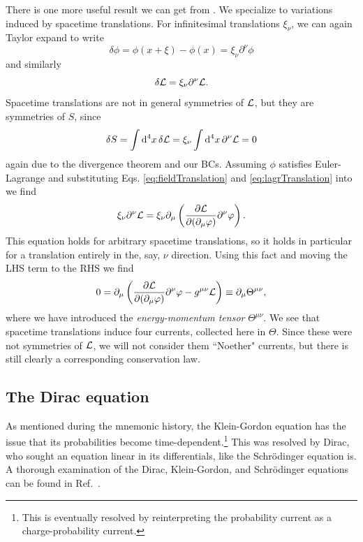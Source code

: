 There is one more useful result we can get from .
We specialize to variations induced by spacetime translations. For infinitesimal
translations $\xi_\nu$, we can again Taylor expand to write
\begin{equation}\label{eq:fieldTranslation}
\delta\phi=\phi(x+\xi)-\phi(x)=\xi_\nu\partial^\nu\phi
\end{equation}
and similarly
\begin{equation}\label{eq:lagrTranslation}
\delta\mathcal{L}=\xi_\nu\partial^\nu\mathcal{L}.
\end{equation}
Spacetime translations are not in general symmetries of $\mathcal{L}$, but they are
symmetries of $S$, since
\begin{equation}
\delta S=\int\dd[4]{x}\delta\mathcal{L}=\xi_\nu\int\dd[4]{x}\partial^\nu\mathcal{L}=0
\end{equation}
again due to the divergence theorem and our BCs. Assuming $\phi$ satisfies
Euler-Lagrange and substituting Eqs. \eqref{eq:fieldTranslation} and
\eqref{eq:lagrTranslation} into  we find
\begin{equation}
\xi_\nu\partial^\nu\mathcal{L}
=\xi_\nu\partial_\mu\left(\pdv{\mathcal{L}}{(\partial_\mu\varphi)}\partial^\nu\varphi\right).
\end{equation}
This equation holds for arbitrary spacetime translations, so it holds in
particular for a translation entirely in the, say, $\nu$ direction.
Using this fact and moving the LHS term to the RHS we find
\begin{equation}
0=\partial_\mu\left(\pdv{\mathcal{L}}{(\partial_\mu\varphi)}\partial^\nu\varphi
-g^{\mu\nu}\mathcal{L}\right)\equiv\partial_\mu \Theta^{\mu\nu},
\end{equation}
where we have introduced the {\it energy-momentum tensor} $\Theta^{\mu\nu}$. We see that spacetime translations induce four
currents, collected here in $\Theta$. Since these were not symmetries of
$\mathcal{L}$, we will not consider them ``Noether" currents, but there is still
clearly a corresponding conservation law.




\subsection{The Dirac equation}

As mentioned during the mnemonic history, the Klein-Gordon equation has the 
issue that its probabilities become time-dependent.\footnote{This is eventually
resolved by reinterpreting the probability current as a charge-probability
current.} This was resolved by Dirac, who sought an equation linear in its
differentials, like the Schr\"odinger equation is.
A thorough examination of the Dirac, Klein-Gordon, and Schr\"odinger equations
can be found in Ref.~\cite{tsutsui:2025}. 

